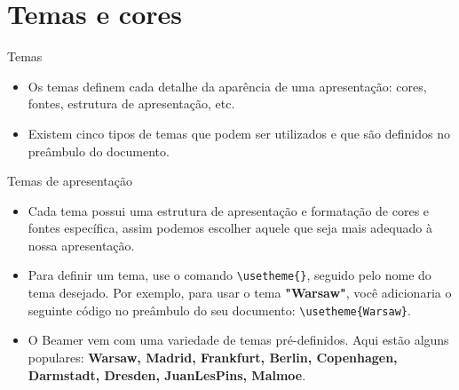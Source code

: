 \documentclass{beamer}
\begin{document}
\section{Temas e cores}

\begin{frame}[fragile]
\begin{block}{Temas}
    \begin{itemize}
        \item <1-> Os temas definem cada detalhe da aparência de uma apresentação: cores, fontes, estrutura de apresentação, etc. 
        
        \item <2-> Existem cinco tipos de temas que podem ser utilizados  e que são definidos no preâmbulo do documento.
    \end{itemize}
\end{block}
\end{frame}

\begin{frame}[fragile]
    \begin{block}{Temas de apresenta\c c\~ao}
        
        \begin{itemize} \justifying
            \item <1-> Cada tema possui uma estrutura de apresentação e formatação de cores e fontes específica, assim podemos escolher aquele que seja mais adequado à nossa apresentação. 
            
            \item <2-> Para definir um tema, use o comando \verb|\usetheme{}|, seguido pelo nome do tema desejado. Por exemplo, para usar o tema \textbf{"Warsaw"}, você adicionaria o seguinte código no preâmbulo do seu documento: \verb|\usetheme{Warsaw}|.

            \item <3-> O Beamer vem com uma variedade de temas pré-definidos. Aqui estão alguns populares: \textbf{Warsaw, Madrid, Frankfurt, Berlin, Copenhagen, Darmstadt, Dresden, JuanLesPins, Malmoe}.
        \end{itemize}
    \end{block}
\end{frame}
\end{document}
